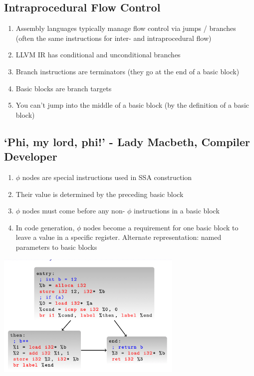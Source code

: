 \documentclass[a4paper]{article}
\theoremstyle{definition}
\begin{document}
\subsection{Intraprocedural Flow Control}
\begin{enumerate}
  \item Assembly languages typically manage flow control via jumps / branches (often the same instructions for inter- and intraprocedural flow)
  \item LLVM IR has conditional and unconditional branches
  \item Branch instructions are terminators (they go at the end of a
  basic block)
  \item Basic blocks are branch targets
  \item You can’t jump into the middle of a basic block (by the definition of a basic block)
\end{enumerate}

\subsection{‘Phi, my lord, phi!’ - Lady Macbeth, Compiler Developer}

\begin{enumerate}
  \item  $\phi$ nodes are special instructions used in SSA construction
  \item Their value is determined by the preceding basic block
  \item $\phi$ nodes must come before any non- $\phi$ instructions in a basic
  block
  \item In code generation, $\phi$ nodes become a requirement for one
  basic block to leave a value in a specific register.
  Alternate representation: named parameters to basic blocks
\end{enumerate}
\begin{center}
  \includegraphics[height=6cm]{img/Snipaste_2021-04-05_17-40-27.png}
  \end{center}
\end{document}

